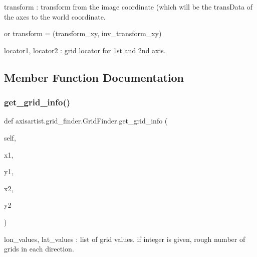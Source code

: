 \begin{DoxyVerb}transform : transform from the image coordinate (which will be
the transData of the axes to the world coordinate.

or transform = (transform_xy, inv_transform_xy)

locator1, locator2 : grid locator for 1st and 2nd axis.
\end{DoxyVerb}
 

\subsection{Member Function Documentation}
\mbox{\label{classaxisartist_1_1grid__finder_1_1GridFinder_a340ff860d9f9a9d0e90ffa5b76ed5bac}} 
\subsubsection{\texorpdfstring{get\+\_\+grid\+\_\+info()}{get\_grid\_info()}}
{\footnotesize\ttfamily def axisartist.\+grid\+\_\+finder.\+Grid\+Finder.\+get\+\_\+grid\+\_\+info (\begin{DoxyParamCaption}\item[{}]{self,  }\item[{}]{x1,  }\item[{}]{y1,  }\item[{}]{x2,  }\item[{}]{y2 }\end{DoxyParamCaption})}

\begin{DoxyVerb}lon_values, lat_values : list of grid values. if integer is given,
           rough number of grids in each direction.
\end{DoxyVerb}
 \mbox{\label{classaxisartist_1_1grid__finder_1_1GridFinder_aa83870fcb998bc3fd030e320eb110976}} 
